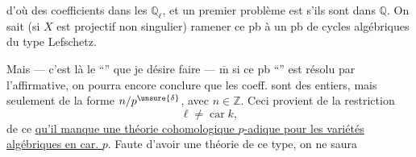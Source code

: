 
d'où des coefficients dans les $\mathbb Q_\ell$, et un premier problème est s'ils sont dans $\mathbb Q$. On sait (si $X$ est projectif non singulier) ramener ce pb à un pb de cycles algébriques du type Lefschetz.

Mais --- c'est là le ``'' que je désire faire --- $\overline{\mathrm m}$ si ce pb ``''  est résolu par l'affirmative, on  pourra encore conclure que les coeff. sont des entiers, mais seulement  de  la forme $n/p^{\unsure{\delta}}$, avec $n\in\mathbb Z$. Ceci provient de la restriction
\[
\ell\ne\operatorname{car} k,
\]
de ce \uline{qu'il manque une théorie cohomologique $p$-adique pour les variétés algébriques en car. $p$}. Faute d'avoir une théorie de ce type, on ne saura

